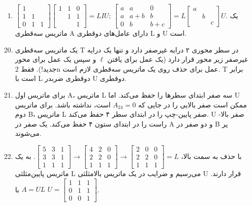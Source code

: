 \documentclass[12pt,a4paper]{article}
\begin{document}
{\begin{enumerate}
			\item $\begin{bmatrix} 1 & & \\ 1 & 1 & \\ 0 & 1 & 1 \end{bmatrix} \begin{bmatrix} 1 & 1 & 0 \\ & 1 & 1 \\ & & 1 \end{bmatrix} = LIU$;
			$\begin{bmatrix} a & a & 0 \\ a & a+b & b \\ 0 & b & b+c \end{bmatrix} = L \begin{bmatrix} a & & \\ & b & \\ & & c \end{bmatrix} U$.
			یک ماتریس سه‌قطری A دارای عامل‌های دوقطری L و U است.
		\end{enumerate}
		
		
		\begin{enumerate}
			\setcounter{enumi}{19}
			\item یک ماتریس سه‌قطری T در سطر محوری ۲ درایه غیرصفر دارد و تنها یک درایه غیرصفر زیر محور قرار دارد (یک عمل برای یافتن $\ell$ و سپس یک عمل برای محور جدید!). فقط 2n عمل برای حذف روی یک ماتریس سه‌قطری لازم است. T برابر است با L دوقطری ضربدر U دوقطری.
			
			\item برای ماتریس اول A، ماتریس L سه صفر ابتدای سطرها را حفظ می‌کند. اما U ممکن است صفر بالایی را در جایی که $A_{24}=0$ است، نداشته باشد. برای ماتریس دوم B، ماتریس L صفر پایین-چپ را در ابتدای سطر ۴ حفظ می‌کند. U صفر بالا-راست را در ابتدای ستون ۴ حفظ می‌کند. یک صفر در A و دو صفر در B پر می‌شوند.
			
			\item با حذف به سمت بالا، $\begin{bmatrix} 5 & 3 & 1 \\ 3 & 3 & 1 \\ 1 & 1 & 1 \end{bmatrix} \to \begin{bmatrix} 4 & 2 & 0 \\ 2 & 2 & 0 \\ 1 & 1 & 1 \end{bmatrix} \to \begin{bmatrix} 2 & 0 & 0 \\ 2 & 2 & 0 \\ 1 & 1 & 1 \end{bmatrix} = L$. به یک ماتریس پایین‌مثلثی L می‌رسیم و ضرایب در یک ماتریس بالا‌مثلثی U قرار دارند. $A=UL$ با $U = \begin{bmatrix} 1 & 1 & 1 \\ 0 & 1 & 1 \\ 0 & 0 & 1 \end{bmatrix}$.
			

\end{enumerate}}
\end{document}
